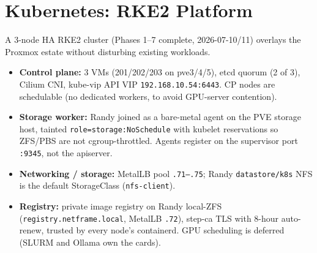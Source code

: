 \documentclass[11pt,letterpaper]{article}
\newcommand{\ip}[1]{\texttt{#1}}
\begin{document}
\section{Kubernetes: RKE2 Platform}
A 3-node HA RKE2 cluster (Phases 1--7 complete, 2026-07-10/11) overlays the Proxmox estate without disturbing existing workloads.
\begin{center}
\end{center}
\begin{itemize}[leftmargin=1.2em,itemsep=1pt]
  \item \textbf{Control plane:} 3 VMs (201/202/203 on pve3/4/5), etcd quorum (2 of 3), Cilium CNI, kube-vip API VIP \ip{192.168.10.54:6443}. CP nodes are schedulable (no dedicated workers, to avoid GPU-server contention).
  \item \textbf{Storage worker:} Randy joined as a bare-metal agent on the PVE storage host, tainted \texttt{role=\allowbreak storage:\allowbreak NoSchedule} with kubelet reservations so ZFS/PBS are not cgroup-throttled. Agents register on the supervisor port \texttt{:9345}, not the apiserver.
  \item \textbf{Networking / storage:} MetalLB pool \ip{.71--.75}; Randy \texttt{datastore/k8s} NFS is the default StorageClass (\texttt{nfs-client}).
  \item \textbf{Registry:} private image registry on Randy local-ZFS (\texttt{registry.netframe.local}, MetalLB \ip{.72}), step-ca TLS with 8-hour auto-renew, trusted by every node's containerd. GPU scheduling is deferred (SLURM and Ollama own the cards).
\end{itemize}
\end{document}
